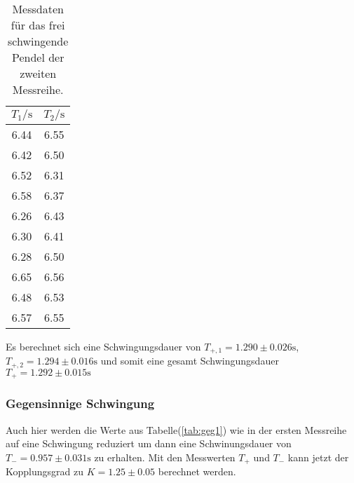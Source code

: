             \begin{table}[ht]
                \centering
                \caption{Messdaten für das frei schwingende Pendel der zweiten Messreihe.}
                \label{tab:frei2}
                \begin{tabular}{c c}
                 \toprule
                 $T_1 / \si{\s}$ & $T_2 / \si{\s}$\\
                 \midrule
                 6.44  &  6.55 \\
                 6.42  &  6.50 \\
                 6.52  &  6.31 \\
                 6.58  &  6.37 \\
                 6.26  &  6.43 \\
                 6.30  &  6.41 \\
                 6.28  &  6.50 \\
                 6.65  &  6.56 \\
                 6.48  &  6.53 \\
                 6.57  &  6.55 \\
                 \bottomrule
                \end{tabular}
            \end{table}
            
            \noindent Es berechnet sich eine Schwingungsdauer von $T_{+,1} = 1.290 \pm 0.026 \si{\second}$, $T_{+,2} = 1.294 \pm 0.016 \si{\second}$
            und somit eine gesamt Schwingungsdauer $T_+ = 1.292 \pm 0.015 \si{\second}$

        \subsubsection{Gegensinnige Schwingung}

            \noindent Auch hier werden die Werte aus Tabelle(\ref{tab:geg1}) wie in der ersten Messreihe auf eine Schwingung reduziert 
            um dann eine Schwinungsdauer von $T_- = 0.957 \pm 0.031 \si{\second}$ zu erhalten. Mit den Messwerten $T_+$ und $T_-$ kann jetzt  
            der Kopplungsgrad zu $K = 1.25 \pm 0.05$ berechnet werden.


